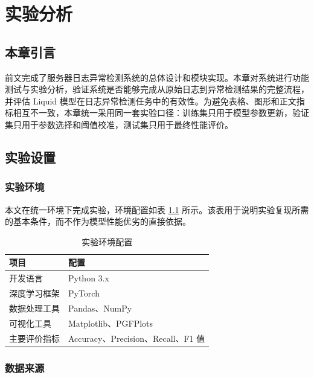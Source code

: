 \chapter{实验分析}
\vspace{7pt}

\section{本章引言}

前文完成了服务器日志异常检测系统的总体设计和模块实现。本章对系统进行功能测试与实验分析，验证系统是否能够完成从原始日志到异常检测结果的完整流程，并评估 Liquid 模型在日志异常检测任务中的有效性。为避免表格、图形和正文指标相互不一致，本章统一采用同一套实验口径：训练集只用于模型参数更新，验证集只用于参数选择和阈值校准，测试集只用于最终性能评价。

\section{实验设置}

\subsection{实验环境}

本文在统一环境下完成实验，环境配置如表 \ref{tab:experiment_environment_revised} 所示。该表用于说明实验复现所需的基本条件，而不作为模型性能优劣的直接依据。

\begin{table}[htbp]
    \centering
    \caption{实验环境配置}
    \label{tab:experiment_environment_revised}
    \begin{tabular}{p{4cm}p{8cm}}
        \hline
        \textbf{项目} & \textbf{配置} \\
        \hline
        开发语言 & Python 3.x \\
        深度学习框架 & PyTorch \\
        数据处理工具 & Pandas、NumPy \\
        可视化工具 & Matplotlib、PGFPlots \\
        主要评价指标 & Accuracy、Precision、Recall、F1 值 \\
        \hline
    \end{tabular}
\end{table}

\subsection{数据来源}

